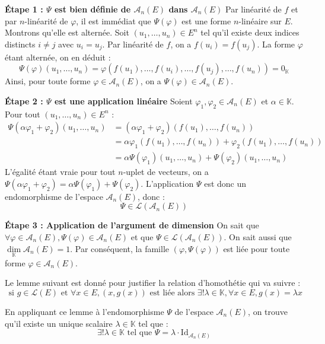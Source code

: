 \documentclass[11pt, a4paper]{article}
\theoremstyle{definition}
\begin{document}
\begin{outline}
	\1 \textbf{Étape 1 : $\Psi$ est bien définie de $\mathscr{A}_n(E)$ dans $\mathscr{A}_n(E)$}
	\2 Par linéarité de $f$ et par $n$-linéarité de $\varphi$, il est immédiat que $\Psi(\varphi)$ est une forme $n$-linéaire sur $E$.
	\2 Montrons qu'elle est alternée. Soit $(u_1, \dots, u_n) \in E^n$ tel qu'il existe deux indices distincts $i \neq j$ avec $u_i = u_j$. Par linéarité de $f$, on a $f(u_i) = f(u_j)$. La forme $\varphi$ étant alternée, on en déduit :
	$$\Psi(\varphi)(u_1, \dots, u_n) = \varphi(f(u_1), \dots, f(u_i), \dots, f(u_j), \dots, f(u_n)) = 0_\mathbb{K}$$
	Ainsi, pour toute forme $\varphi \in \mathscr{A}_n(E)$, on a $\Psi(\varphi) \in \mathscr{A}_n(E)$.

	\1 \textbf{Étape 2 : $\Psi$ est une application linéaire}
	\2 Soient $\varphi_1, \varphi_2 \in \mathscr{A}_n(E)$ et $\alpha \in \mathbb{K}$. Pour tout $(u_1, \dots, u_n) \in E^n$ :
	\begin{align*}
		\Psi(\alpha \varphi_1 + \varphi_2)(u_1, \dots, u_n) &= (\alpha \varphi_1 + \varphi_2)(f(u_1), \dots, f(u_n)) \\
		&= \alpha \varphi_1(f(u_1), \dots, f(u_n)) + \varphi_2(f(u_1), \dots, f(u_n)) \\
		&= \alpha \Psi(\varphi_1)(u_1, \dots, u_n) + \Psi(\varphi_2)(u_1, \dots, u_n)
	\end{align*}
	L'égalité étant vraie pour tout $n$-uplet de vecteurs, on a $\Psi(\alpha \varphi_1 + \varphi_2) = \alpha \Psi(\varphi_1) + \Psi(\varphi_2)$. L'application $\Psi$ est donc un endomorphisme de l'espace $\mathscr{A}_n(E)$, donc :
	$$\Psi \in \mathcal{L}(\mathscr{A}_n(E))$$

	\1 \textbf{Étape 3 : Application de l'argument de dimension}
	\2 On sait que $\forall \varphi \in \mathscr A_n(E), \Psi(\varphi) \in \mathscr A_n(E)$ et que $\Psi \in \mathcal L(\mathcal A_n(E))$. On sait aussi que $\underset{\mathbb{K}}\dim\mathscr A_n(E) = 1$. Par conséquent, la famille $(\varphi, \Psi(\varphi))$ est liée pour toute forme $\varphi \in \mathscr A_n(E)$.

	\2 Le lemme suivant est donné pour justifier la relation d'homothétie qui va suivre :
	$$\boxed{\text{ si } g \in \mathcal L(E) \text{ et } \forall x \in E, (x,g(x)) \text{ est liée} \text{ alors } \exists ! \lambda \in \mathbb{K}, \forall x \in E, g(x) = \lambda x}$$

	\2 En appliquant ce lemme à l'endomorphisme $\Psi$ de l'espace $\mathscr{A}_n(E)$, on trouve qu'il existe un unique scalaire $\lambda \in \mathbb{K}$ tel que :
	$$\exists ! \lambda \in \mathbb{K} \text{ tel que } \Psi = \lambda \cdot \mathrm{Id}_{\mathscr{A}_n(E)}$$


\end{outline}
\end{document}
